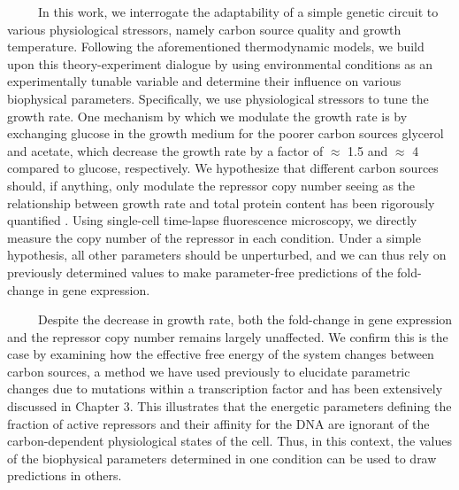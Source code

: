 \documentclass[12pt]{caltech_thesis}
\begin{document}
~~~~~In this work, we interrogate the adaptability of a simple genetic
circuit to various physiological stressors, namely carbon source quality
and growth temperature. Following the aforementioned thermodynamic
models, we build upon this theory-experiment dialogue by using
environmental conditions as an experimentally tunable variable and
determine their influence on various biophysical parameters.
Specifically, we use physiological stressors to tune the growth rate.
One mechanism by which we modulate the growth rate is by exchanging
glucose in the growth medium for the poorer carbon sources glycerol and
acetate, which decrease the growth rate by a factor of \(\approx\) 1.5
and \(\approx\) 4 compared to glucose, respectively. We hypothesize that
different carbon sources should, if anything, only modulate the
repressor copy number seeing as the relationship between growth rate and
total protein content has been rigorously quantified
\autocite{schaechter1958,schmidt2016,li2014,jun2018}. Using single-cell
time-lapse fluorescence microscopy, we directly measure the copy number
of the repressor in each condition. Under a simple hypothesis, all other
parameters should be unperturbed, and we can thus rely on previously
determined values to make parameter-free predictions of the fold-change
in gene expression.

~~~~~Despite the decrease in growth rate, both the fold-change in gene
expression and the repressor copy number remains largely unaffected. We
confirm this is the case by examining how the effective free energy of
the system changes between carbon sources, a method we have used
previously to elucidate parametric changes due to mutations within a
transcription factor \autocite{chure2019} and has been extensively
discussed in Chapter 3. This illustrates that the energetic parameters
defining the fraction of active repressors and their affinity for the
DNA are ignorant of the carbon-dependent physiological states of the
cell. Thus, in this context, the values of the biophysical parameters
determined in one condition can be used to draw predictions in others.
\end{document}
